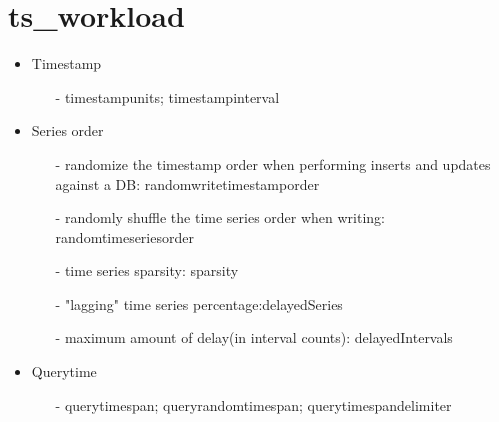 \documentclass[UTF8,a4paper]{ctexart}
\begin{document}
	\section{ts\_workload}
	\begin{itemize}
		\item Timestamp
		\begin{itemize}
			\small\item[-] timestampunits; timestampinterval
		\end{itemize}
		
		\item Series order
		\begin{itemize}
			\small\item[-] randomize the timestamp order when performing inserts and updates against a DB: randomwritetimestamporder
			\small\item[-] randomly shuffle the time series order when writing: randomtimeseriesorder 
			\small\item[-] time series sparsity: sparsity 
			\small\item[-] "lagging" time series percentage:delayedSeries
			\small\item[-] maximum amount of delay(in interval counts): delayedIntervals
		\end{itemize}
	
			\item Querytime
		\begin{itemize}
			\small\item[-] querytimespan; queryrandomtimespan; querytimespandelimiter
		\end{itemize}
	
	\end{itemize}
		
	

	
\end{document}
